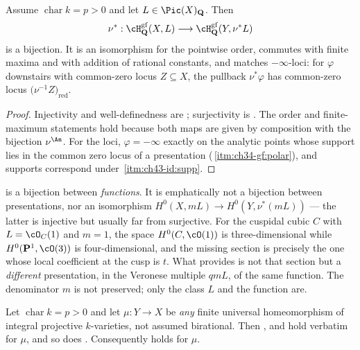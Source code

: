 \begin{corollary}
\label{cor:ch43-gf-bijection}
Assume $\operatorname{char}k=p>0$ and let
$L\in\Pic(X)_{\mathbf Q}$.  Then
\[
 \nu^*:\cH^{\mathrm{gf}}_{\mathbf Q}(X,L)
 \longrightarrow
 \cH^{\mathrm{gf}}_{\mathbf Q}(Y,\nu^*L)
\]
is a bijection.  It is an isomorphism for the pointwise order, commutes with
finite maxima and with addition of rational constants, and matches
$-\infty$-loci: for $\varphi$ downstairs with common-zero locus
$Z\subseteq X$, the pullback $\nu^*\varphi$ has common-zero locus
$\bigl(\nu^{-1}Z\bigr)_{\mathrm{red}}$.
\end{corollary}

\begin{proof}
Injectivity and well-definedness are
; surjectivity is
.  The order and finite-maximum statements hold
because both maps are given by composition with the bijection
$\nu^{\An}$.  For the loci, $\varphi=-\infty$ exactly on the analytic
points whose support lies in the common zero locus of a presentation
(\,\cref{itm:ch34-gf:polar}), and supports
correspond under
\,\cref{itm:ch43-id:supp}.
\end{proof}

\begin{remark}
\label{rem:ch43-not-presentations}
 is a bijection between \emph{functions}.  It is
emphatically not a bijection between presentations, nor an isomorphism
$H^0(X,mL)\to H^0(Y,\nu^*(mL))$ --- the latter is injective but usually
far from surjective.  For the cuspidal cubic $C$ with $L=\cO_C(1)$ and
$m=1$, the space $H^0(C,\cO(1))$ is three-dimensional while
$H^0(\mathbf P^1,\cO(3))$ is four-dimensional, and the missing section is
precisely the one whose local coefficient at the cusp is $t$.  What
 provides is not that section but a
\emph{different} presentation, in the Veronese multiple $qmL$, of the same
function.  The denominator $m$ is not preserved; only the class $L$ and
the function are.
\end{remark}

\begin{proposition}
\label{prop:ch43-frobenius-no-birational}
Let $\operatorname{char}k=p>0$ and let $\mu:Y\to X$ be \emph{any} finite
universal homeomorphism of integral projective $k$-varieties, not assumed
birational.  Then ,
 and
 hold verbatim for $\mu$, and so does
.  Consequently
 holds for $\mu$.
\end{proposition}

